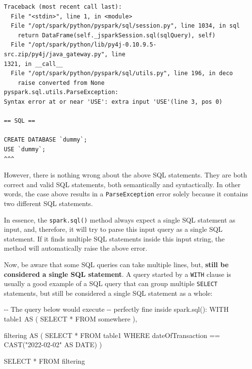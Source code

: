 \documentclass[
  11pt,
  letterpaper,
  DIV=11,
  numbers=noendperiod]{scrreprt}
\newenvironment{Shaded}{\begin{snugshade}}{\end{snugshade}}
\newcommand{\CommentTok}[1]{\textcolor[rgb]{0.37,0.37,0.37}{#1}}
\newcommand{\DataTypeTok}[1]{\textcolor[rgb]{0.68,0.00,0.00}{#1}}
\newcommand{\FunctionTok}[1]{\textcolor[rgb]{0.28,0.35,0.67}{#1}}
\newcommand{\KeywordTok}[1]{\textcolor[rgb]{0.00,0.23,0.31}{#1}}
\newcommand{\NormalTok}[1]{\textcolor[rgb]{0.00,0.23,0.31}{#1}}
\newcommand{\OperatorTok}[1]{\textcolor[rgb]{0.37,0.37,0.37}{#1}}
\newcommand{\OtherTok}[1]{\textcolor[rgb]{0.00,0.23,0.31}{#1}}
\begin{document}
\begin{verbatim}
Traceback (most recent call last):
  File "<stdin>", line 1, in <module>
  File "/opt/spark/python/pyspark/sql/session.py", line 1034, in sql
    return DataFrame(self._jsparkSession.sql(sqlQuery), self)
  File "/opt/spark/python/lib/py4j-0.10.9.5-src.zip/py4j/java_gateway.py", line 
1321, in __call__
  File "/opt/spark/python/pyspark/sql/utils.py", line 196, in deco
    raise converted from None
pyspark.sql.utils.ParseException: 
Syntax error at or near 'USE': extra input 'USE'(line 3, pos 0)

== SQL ==

CREATE DATABASE `dummy`;
USE `dummy`;
^^^
\end{verbatim}

However, there is nothing wrong about the above SQL statements. They are
both correct and valid SQL statements, both semantically and
syntactically. In other words, the case above results in a
\texttt{ParseException} error solely because it contains two different
SQL statements.

In essence, the \texttt{spark.sql()} method always expect a single SQL
statement as input, and, therefore, it will try to parse this input
query as a single SQL statement. If it finds multiple SQL statements
inside this input string, the method will automatically raise the above
error.

Now, be aware that some SQL queries can take multiple lines, but,
\textbf{still be considered a single SQL statement}. A query started by
a \texttt{WITH} clause is usually a good example of a SQL query that can
group multiple \texttt{SELECT} statements, but still be considered a
single SQL statement as a whole:

\begin{Shaded}
\begin{Highlighting}[]
\CommentTok{{-}{-} The query below would execute}
\CommentTok{{-}{-} perfectly fine inside spark.sql():}
\KeywordTok{WITH}\NormalTok{ table1 }\KeywordTok{AS}\NormalTok{ (}
  \KeywordTok{SELECT} \OperatorTok{*}
  \KeywordTok{FROM}\NormalTok{ somewhere}
\NormalTok{),}

\NormalTok{filtering }\KeywordTok{AS}\NormalTok{ (}
  \KeywordTok{SELECT} \OperatorTok{*}
  \KeywordTok{FROM}\NormalTok{ table1}
  \KeywordTok{WHERE}\NormalTok{ dateOfTransaction }\OperatorTok{==} \FunctionTok{CAST}\NormalTok{(}\OtherTok{"2022{-}02{-}02"} \KeywordTok{AS} \DataTypeTok{DATE}\NormalTok{)}
\NormalTok{)}

\KeywordTok{SELECT} \OperatorTok{*}
\KeywordTok{FROM}\NormalTok{ filtering}
\end{Highlighting}
\end{Shaded}
\end{document}
